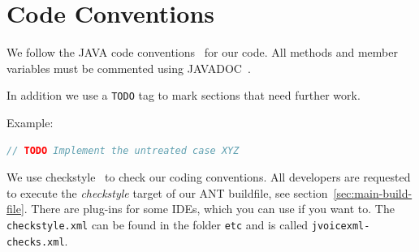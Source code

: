 \documentclass[11pt,a4paper]{article}
\begin{document}
\section{Code Conventions}
\label{sec:code-conventions}

We follow the JAVA code conventions~\cite{sun:codeconv} for our code. All
methods and member variables must be commented using 
JAVADOC~\cite{sun:javadoc_guidelines}.

In addition we use a \texttt{TODO} tag to mark sections that need further work.

Example:

\begin{lstlisting}[language=Java]
// TODO Implement the untreated case XYZ
\end{lstlisting}

We use checkstyle~\cite{checkstyle} to check our coding conventions.
All developers are requested to execute the \emph{checkstyle} target
of our ANT buildfile, see section~\ref{sec:main-build-file}. 
There are plug-ins for some IDEs, which you can use if you want to. The
\texttt{checkstyle.xml} can be found in the folder 
\texttt{etc} and is called \texttt{jvoicexml-checks.xml}.
\end{document}
